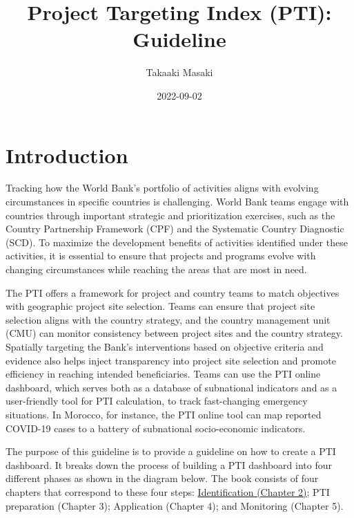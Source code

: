 \documentclass[
]{book}
\title{Project Targeting Index (PTI): Guideline}
\author{Takaaki Masaki}
\date{2022-09-02}
\begin{document}
\maketitle

{
\setcounter{tocdepth}{1}
\tableofcontents
}
\hypertarget{introduction}{%
\chapter{Introduction}\label{introduction}}

Tracking how the World Bank's portfolio of activities aligns with evolving circumstances in specific countries is challenging. World Bank teams engage with countries through important strategic and prioritization exercises, such as the Country Partnership Framework (CPF) and the Systematic Country Diagnostic (SCD). To maximize the development benefits of activities identified under these activities, it is essential to ensure that projects and programs evolve with changing circumstances while reaching the areas that are most in need.

The PTI offers a framework for project and country teams to match objectives with geographic project site selection. Teams can ensure that project site selection aligns with the country strategy, and the country management unit (CMU) can monitor consistency between project sites and the country strategy. Spatially targeting the Bank's interventions based on objective criteria and evidence also helps inject transparency into project site selection and promote efficiency in reaching intended beneficiaries. Teams can use the PTI online dashboard, which serves both as a database of subnational indicators and as a user-friendly tool for PTI calculation, to track fast-changing emergency situations. In Morocco, for instance, the PTI online tool can map reported COVID-19 cases to a battery of subnational socio-economic indicators.

The purpose of this guideline is to provide a guideline on how to create a PTI dashboard. It breaks down the process of building a PTI dashboard into four different phases as shown in the diagram below. The book consists of four chapters that correspond to these four steps: \protect\hyperlink{identification}{Identification (Chapter 2)}; PTI preparation (Chapter 3); Application (Chapter 4); and Monitoring (Chapter 5).
\end{document}
